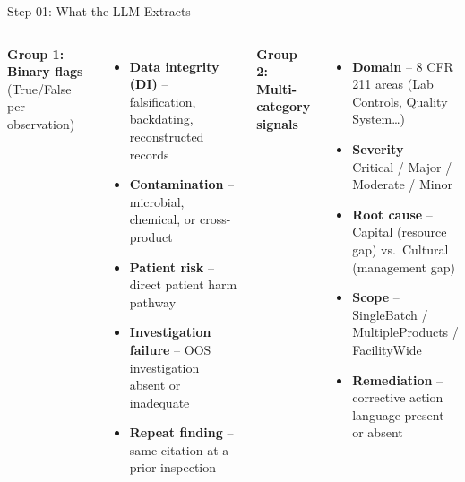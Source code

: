\documentclass[aspectratio=169,10pt]{beamer}
\begin{document}
\begin{frame}{Step 01: What the LLM Extracts}
\begin{columns}[T]
\textbf{Group 1: Binary flags} {\footnotesize (True/False per observation)}

\vspace{3pt}
{\small
\begin{itemize}
  \setlength{\itemsep}{4pt}
  \item \textbf{Data integrity (DI)} -- falsification, backdating, reconstructed records
  \item \textbf{Contamination} -- microbial, chemical, or cross-product
  \item \textbf{Patient risk} -- direct patient harm pathway
  \item \textbf{Investigation failure} -- OOS investigation absent or inadequate
  \item \textbf{Repeat finding} -- same citation at a prior inspection
\end{itemize}
}

\pause
\textbf{Group 2: Multi-category signals}

\vspace{3pt}
{\small
\begin{itemize}
  \setlength{\itemsep}{4pt}
  \item \textbf{Domain} -- 8 CFR\,211 areas (Lab Controls, Quality System\ldots)
  \item \textbf{Severity} -- Critical / Major / Moderate / Minor
  \item \textbf{Root cause} -- Capital (resource gap) vs.\ Cultural (management gap)
  \item \textbf{Scope} -- SingleBatch / MultipleProducts / FacilityWide
  \item \textbf{Remediation} -- corrective action language present or absent
\end{itemize}
}
\end{columns}
\end{frame}
\end{document}
